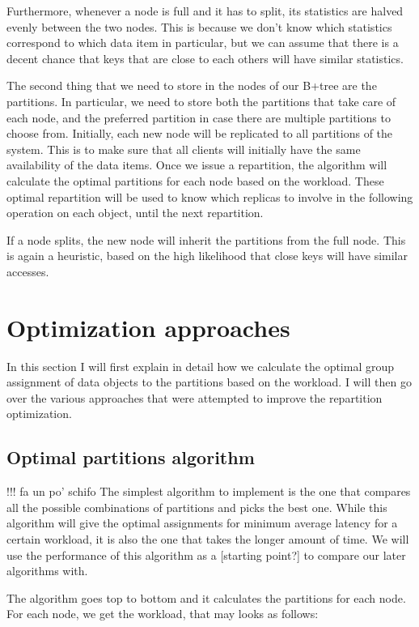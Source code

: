 Furthermore, whenever a node is full and it has to split, its statistics are halved evenly between the two nodes. This is because we don't know which statistics correspond to which data item in particular, but we can assume that there is a decent chance that keys that are close to each others will have similar statistics.

The second thing that we need to store in the nodes of our B+tree are the partitions. In particular, we need to store both the partitions that take care of each node, and the preferred partition in case there are multiple partitions to choose from. Initially, each new node will be replicated to all partitions of the system. This is to make sure that all clients will initially have the same availability of the data items. Once we issue a repartition, the algorithm will calculate the optimal partitions for each node based on the workload. These optimal repartition will be used to know which replicas to involve in the following operation on each object, until the next repartition. 

If a node splits, the new node will inherit the partitions from the full node. This is again a heuristic, based on the high likelihood that close keys will have similar accesses.


\section{Optimization approaches}\label{sec:optimization-approaches}
In this section I will first explain in detail how we calculate the optimal group assignment of data objects to the partitions based on the workload. I will then go over the various approaches that were attempted to improve the repartition optimization. 

\subsection{Optimal partitions algorithm}\label{sec:optimal-partitions-algorithm} 
!!! fa un po' schifo
The simplest algorithm to implement is the one that compares all the possible combinations of partitions and picks the best one. While this algorithm will give the optimal assignments for minimum average latency for a certain workload, it is also the one that takes the longer amount of time. We will use the performance of this algorithm as a [starting point?] to compare our later algorithms with.

The algorithm goes top to bottom and it calculates the partitions for each node. For each node, we get the workload, that may looks as follows:

